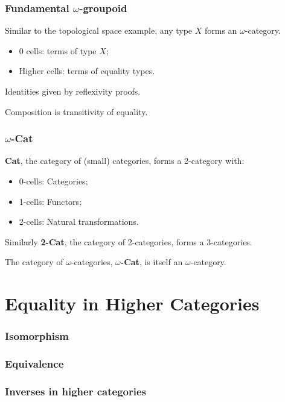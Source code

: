 \documentclass[presentation]{beamer}
\begin{document}
\begin{frame}
  \frametitle{Fundamental \(\omega\)-groupoid}
  Similar to the topological space example, any type \(X\) forms an \(\omega\)-category.

  \pause{}
  \begin{itemize}
  \item 0 cells: terms of type \(X\);
  \item Higher cells: terms of equality types.
  \end{itemize}

  \pause{}
  Identities given by reflexivity proofs.

  \pause{}
  Composition is transitivity of equality.
\end{frame}

\begin{frame}
  \frametitle{\(\omega\)-\textbf{Cat}}
  \textbf{Cat}, the category of (small) categories, forms a 2-category with:
  \begin{itemize}
  \item 0-cells: Categories;
  \item 1-cells: Functors;
  \item 2-cells: Natural transformations.
  \end{itemize}

  \pause{}
  Similarly \textbf{2-Cat}, the category of 2-categories, forms a 3-categories.

  \pause{}
  The category of \(\omega\)-categories, \textbf{\(\omega\)-Cat}, is itself an \(\omega\)-category.
\end{frame}

\section{Equality in Higher Categories}

\begin{frame}
  \frametitle{Isomorphism}
\end{frame}

\begin{frame}
  \frametitle{Equivalence}
\end{frame}

\begin{frame}
  \frametitle{Inverses in higher categories}
\end{frame}
\end{document}
